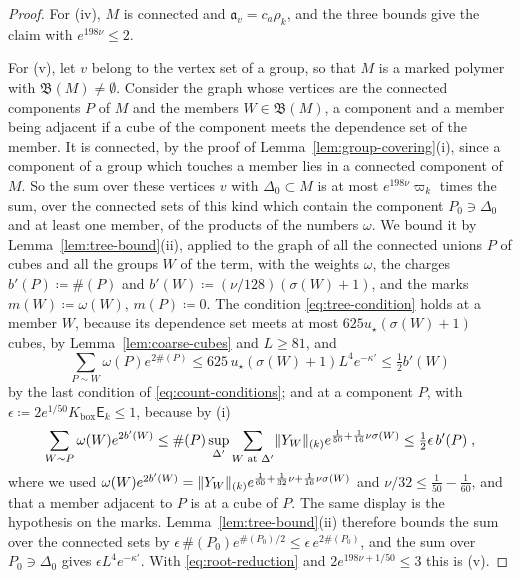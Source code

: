 \documentclass[11pt]{preprint}
\DeclarePairedDelimiter{\norm}{\lVert}{\rVert}
\numberwithin{equation}{section}
\theoremstyle{definition}
\theoremstyle{remark}
\theoremstyle{plain}
\begin{document}
\begin{proof}
For (iv), $M$ is connected and $\mathfrak a_v = c_a\rho_k$, and the three bounds give the claim with $e^{198\nu} \leq 2$.

For (v), let $v$ belong to the vertex set of a group, so that $M$ is a marked polymer with $\mathfrak B(M) \neq \emptyset$. Consider the graph whose vertices are the connected components $P$ of $M$ and the members $W \in \mathfrak B(M)$, a component and a member being adjacent if a cube of the component meets the dependence set of the member. It is connected, by the proof of Lemma~\ref{lem:group-covering}(i), since a component of a group which touches a member lies in a connected component of $M$. So the sum over these vertices $v$ with $\Delta_0 \subset M$ is at most $e^{198\nu}\varpi_k$ times the sum, over the connected sets of this kind which contain the component $P_0 \ni \Delta_0$ and at least one member, of the products of the numbers $\omega$. We bound it by Lemma~\ref{lem:tree-bound}(ii), applied to the graph of all the connected unions $P$ of cubes and all the groups $W$ of the term, with the weights $\omega$, the charges $b'(P) \coloneqq \#(P)$ and $b'(W) \coloneqq (\nu/128)(\sigma(W) + 1)$, and the marks $m(W) \coloneqq \omega(W)$, $m(P) \coloneqq 0$. The condition \eqref{eq:tree-condition} holds at a member $W$, because its dependence set meets at most $625u_\star(\sigma(W) + 1)$ cubes, by Lemma~\ref{lem:coarse-cubes} and $L \geq 81$, and
\[
    \sum_{P \sim W}\omega(P)e^{2\#(P)} \leq 625\,u_\star(\sigma(W) + 1)L^4e^{-\kappa'} \leq \tfrac12b'(W)
\]
by the last condition of \eqref{eq:count-conditions}; and at a component $P$, with $\epsilon \coloneqq 2e^{1/50}K_{\mathrm{box}}\mathsf E_k \leq 1$, because by (i)
\[
    \sum_{W \sim P}\omega(W)e^{2b'(W)} \leq \#(P)\sup_{\Delta'}\sum_{W \text{ at } \Delta'}\norm{Y_W}_{(k)}e^{\frac{1}{50} + \frac{1}{16}\nu\sigma(W)} \leq \tfrac12\epsilon\,b'(P)\;,
\]
where we used $\omega(W)e^{2b'(W)} = \norm{Y_W}_{(k)}e^{\frac{1}{60} + \frac{1}{32}\nu + \frac{1}{16}\nu\sigma(W)}$ and $\nu/32 \leq \frac{1}{50} - \frac{1}{60}$, and that a member adjacent to $P$ is at a cube of $P$. The same display is the hypothesis on the marks. Lemma~\ref{lem:tree-bound}(ii) therefore bounds the sum over the connected sets by $\epsilon\,\#(P_0)e^{\#(P_0)/2} \leq \epsilon\,e^{2\#(P_0)}$, and the sum over $P_0 \ni \Delta_0$ gives $\epsilon L^4e^{-\kappa'}$. With \eqref{eq:root-reduction} and $2e^{198\nu + 1/50} \leq 3$ this is (v).
\end{proof}
\end{document}
